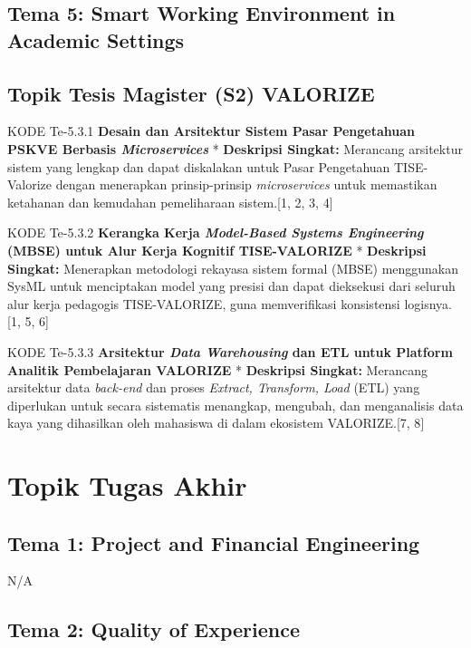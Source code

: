 \documentclass[
  letterpaper,
  DIV=11,
  numbers=noendperiod]{scrreprt}
\begin{document}
\section{Tema 5: Smart Working Environment in Academic
Settings}\label{tema-5-smart-working-environment-in-academic-settings-1}

\section{Topik Tesis Magister (S2)
VALORIZE}\label{topik-tesis-magister-s2-valorize}

KODE Te-5.3.1 \textbf{Desain dan Arsitektur Sistem Pasar Pengetahuan
PSKVE Berbasis \emph{Microservices}} * \textbf{Deskripsi Singkat:}
Merancang arsitektur sistem yang lengkap dan dapat diskalakan untuk
Pasar Pengetahuan TISE-Valorize dengan menerapkan prinsip-prinsip
\emph{microservices} untuk memastikan ketahanan dan kemudahan
pemeliharaan sistem.{[}1, 2, 3, 4{]}

KODE Te-5.3.2 \textbf{Kerangka Kerja \emph{Model-Based Systems
Engineering} (MBSE) untuk Alur Kerja Kognitif TISE-VALORIZE} *
\textbf{Deskripsi Singkat:} Menerapkan metodologi rekayasa sistem formal
(MBSE) menggunakan SysML untuk menciptakan model yang presisi dan dapat
dieksekusi dari seluruh alur kerja pedagogis TISE-VALORIZE, guna
memverifikasi konsistensi logisnya.{[}1, 5, 6{]}

KODE Te-5.3.3 \textbf{Arsitektur \emph{Data Warehousing} dan ETL untuk
Platform Analitik Pembelajaran VALORIZE} * \textbf{Deskripsi Singkat:}
Merancang arsitektur data \emph{back-end} dan proses \emph{Extract,
Transform, Load} (ETL) yang diperlukan untuk secara sistematis
menangkap, mengubah, dan menganalisis data kaya yang dihasilkan oleh
mahasiswa di dalam ekosistem VALORIZE.{[}7, 8{]}


\chapter{Topik Tugas Akhir}\label{topik-tugas-akhir}

\section{Tema 1: Project and Financial
Engineering}\label{tema-1-project-and-financial-engineering-2}

N/A

\section{Tema 2: Quality of
Experience}\label{tema-2-quality-of-experience-2}
\end{document}
